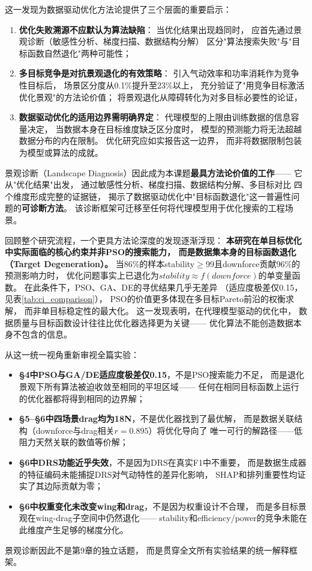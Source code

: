 这一发现为数据驱动优化方法论提供了三个层面的重要启示：

\begin{enumerate}
    \item \textbf{优化失败溯源不应默认为算法缺陷}：
        当优化结果出现趋同时，
        应首先通过景观诊断（敏感性分析、梯度扫描、数据结构分解）
        区分"算法搜索失败"与"目标函数自然退化"两种可能性；

    \item \textbf{多目标竞争是对抗景观退化的有效策略}：
        引入气动效率和功率消耗作为竞争性目标后，
        场景区分度从0.1\%提升至23\%以上，
        充分验证了"用竞争目标激活优化景观"的方法论价值；
        将景观退化从障碍转化为对多目标必要性的论证，

    \item \textbf{数据驱动优化的适用边界需明确界定}：
        代理模型的上限由训练数据的信息容量决定，
        当数据本身在目标维度缺乏区分度时，
        模型的预测能力将无法超越数据分布的内在限制。
        优化研究应如实报告这一边界，
        而非将数据限制包装为模型或算法的成就。
\end{enumerate}

景观诊断（Landscape Diagnosis）因此成为本课题\textbf{最具方法论价值的工作}——
它从"优化结果"出发，
通过敏感性分析、梯度扫描、数据结构分解、多目标对比
四个维度形成完整的证据链，
揭示了数据驱动优化中"目标函数退化"这一普遍性问题的\textbf{可诊断方法}。
该诊断框架可迁移至任何将代理模型用于优化搜索的工程场景。

回顾整个研究流程，一个更具方法论深度的发现逐渐浮现：
\textbf{本研究在单目标优化中实际面临的核心约束并非PSO的搜索能力，
而是数据集本身的目标函数退化（Target Degeneration）。}
当86\%的样本stability$\geq$99且downforce贡献96\%的预测影响力时，
优化问题事实上已退化为$stability\approx f(downforce)$的单变量函数。
在此条件下，PSO、GA、DE的寻优结果几乎无差异
（适应度极差仅0.15，见表\ref{tab:ci_comparison}），
PSO的价值更多体现在多目标Pareto前沿的权衡求解，
而非单目标稳定性的最大化。
这一发现表明，在代理模型驱动的优化中，
数据质量与目标函数设计往往比优化器选择更为关键——
优化算法不能创造数据本身不包含的信息。

从这一统一视角重新审视全篇实验：

\begin{itemize}
    \item \textbf{§4中PSO与GA/DE适应度极差仅0.15}，不是PSO搜索能力不足，
        而是退化景观下所有算法被迫收敛至相同的平坦区域——
        任何在相同目标函数上运行的优化器都将得到相同的边界解；
    \item \textbf{§5--§6中四场景drag均为18N}，不是优化器找到了最优解，
        而是数据关联结构（downforce与drag相关$r=0.895$）将优化导向了
        唯一可行的解路径——低阻力天然关联的数值等价解；
    \item \textbf{§6中DRS功能近乎失效}，不是因为DRS在真实F1中不重要，
        而是数据生成器的特征编码未能捕捉DRS对气动特性的差异化影响，
        SHAP和排列重要性均证实了其边际贡献为零；
    \item \textbf{§6中权重变化未改变wing和drag}，不是因为权重设计不合理，
        而是多目标景观在wing-drag子空间中仍然退化——
        stability和efficiency/power的竞争未能在此维度产生足够的梯度分化。
\end{itemize}

景观诊断因此不是第9章的独立话题，
而是贯穿全文所有实验结果的统一解释框架。
